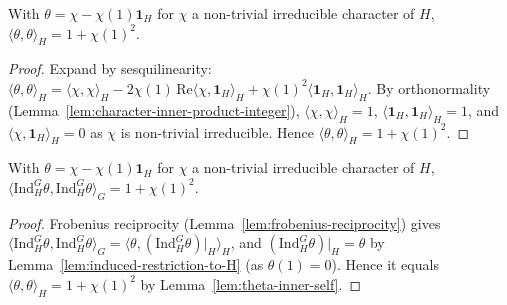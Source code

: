 \begin{lemma}
    \label{lem:theta-inner-self}
    With $\theta = \chi - \chi(1)\mathbf 1_H$ for $\chi$ a non-trivial irreducible
    character of $H$, $\langle \theta, \theta\rangle_H = 1 + \chi(1)^2$.
\end{lemma}
\begin{proof}
    Expand by sesquilinearity:
    $\langle\theta,\theta\rangle_H = \langle\chi,\chi\rangle_H -
    2\chi(1)\,\mathrm{Re}\langle\chi,\mathbf 1_H\rangle_H + \chi(1)^2\langle\mathbf
    1_H,\mathbf 1_H\rangle_H$. By orthonormality
    (Lemma~\ref{lem:character-inner-product-integer}),
    $\langle\chi,\chi\rangle_H = 1$, $\langle\mathbf 1_H,\mathbf 1_H\rangle_H = 1$,
    and $\langle\chi,\mathbf 1_H\rangle_H = 0$ as $\chi$ is non-trivial
    irreducible. Hence $\langle\theta,\theta\rangle_H = 1 + \chi(1)^2$.
\end{proof}

\begin{lemma}
    \label{lem:lift-inner-self}
    With $\theta = \chi - \chi(1)\mathbf 1_H$ for $\chi$ a non-trivial irreducible
    character of $H$, $\langle \mathrm{Ind}_H^G\theta, \mathrm{Ind}_H^G\theta
    \rangle_G = 1 + \chi(1)^2$.
\end{lemma}
\begin{proof}
    Frobenius reciprocity (Lemma~\ref{lem:frobenius-reciprocity}) gives $\langle
    \mathrm{Ind}_H^G\theta, \mathrm{Ind}_H^G\theta\rangle_G = \langle \theta,
    (\mathrm{Ind}_H^G\theta)|_H\rangle_H$, and $(\mathrm{Ind}_H^G\theta)|_H =
    \theta$ by Lemma~\ref{lem:induced-restriction-to-H} (as $\theta(1)=0$). Hence
    it equals $\langle\theta,\theta\rangle_H = 1 + \chi(1)^2$ by
    Lemma~\ref{lem:theta-inner-self}.
\end{proof}

